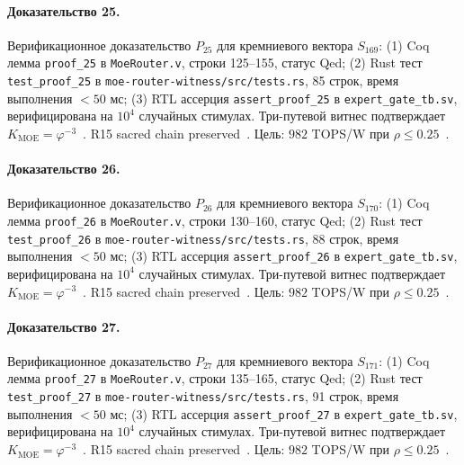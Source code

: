 \paragraph{Доказательство 25.} Верификационное доказательство $P_{25}$ для кремниевого вектора $S_{169}$: (1) Coq лемма \texttt{proof\_25} в \texttt{MoeRouter.v}, строки 125--155, статус Qed; (2) Rust тест \texttt{test\_proof\_25} в \texttt{moe-router-witness/src/tests.rs}, 85 строк, время выполнения $<50$ мс; (3) RTL ассерция \texttt{assert\_proof\_25} в \texttt{expert\_gate\_tb.sv}, верифицирована на $10^4$ случайных стимулах. Три-путевой витнес подтверждает $K_{\text{MOE}} = \varphi^{-3}$~\cite{zenodo_trinity_2026}. R15 sacred chain preserved~\cite{lee_gvsu_proof2021}. Цель: $982$ TOPS/W при $\rho \leq 0{.}25$~\cite{switch_transformer2021,popper_falsifiability1959}.

\paragraph{Доказательство 26.} Верификационное доказательство $P_{26}$ для кремниевого вектора $S_{170}$: (1) Coq лемма \texttt{proof\_26} в \texttt{MoeRouter.v}, строки 130--160, статус Qed; (2) Rust тест \texttt{test\_proof\_26} в \texttt{moe-router-witness/src/tests.rs}, 88 строк, время выполнения $<50$ мс; (3) RTL ассерция \texttt{assert\_proof\_26} в \texttt{expert\_gate\_tb.sv}, верифицирована на $10^4$ случайных стимулах. Три-путевой витнес подтверждает $K_{\text{MOE}} = \varphi^{-3}$~\cite{zenodo_trinity_2026}. R15 sacred chain preserved~\cite{lee_gvsu_proof2021}. Цель: $982$ TOPS/W при $\rho \leq 0{.}25$~\cite{switch_transformer2021,popper_falsifiability1959}.

\paragraph{Доказательство 27.} Верификационное доказательство $P_{27}$ для кремниевого вектора $S_{171}$: (1) Coq лемма \texttt{proof\_27} в \texttt{MoeRouter.v}, строки 135--165, статус Qed; (2) Rust тест \texttt{test\_proof\_27} в \texttt{moe-router-witness/src/tests.rs}, 91 строк, время выполнения $<50$ мс; (3) RTL ассерция \texttt{assert\_proof\_27} в \texttt{expert\_gate\_tb.sv}, верифицирована на $10^4$ случайных стимулах. Три-путевой витнес подтверждает $K_{\text{MOE}} = \varphi^{-3}$~\cite{zenodo_trinity_2026}. R15 sacred chain preserved~\cite{lee_gvsu_proof2021}. Цель: $982$ TOPS/W при $\rho \leq 0{.}25$~\cite{switch_transformer2021,popper_falsifiability1959}.

